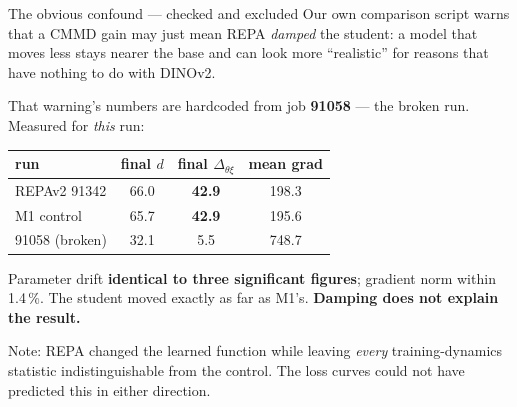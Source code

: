 \documentclass[10pt,aspectratio=169]{beamer}
\newcommand{\good}[1]{\textcolor{good}{\textbf{#1}}}
\begin{document}
\begin{frame}{The obvious confound --- checked and excluded}
  Our own comparison script warns that a CMMD gain may just mean REPA \emph{damped} the student:
  a model that moves less stays nearer the base and can look more ``realistic'' for reasons that
  have nothing to do with DINOv2.

  \vspace{0.5em}
  That warning's numbers are hardcoded from job \textbf{91058} --- the broken run. Measured for
  \emph{this} run:

  \begin{center}
  \begin{tabular}{lccc}
    \toprule
    run & final $d$ & final $\Delta_{\theta\xi}$ & mean grad \\
    \midrule
    REPAv2 91342 & 66.0 & \textbf{42.9} & 198.3 \\
    M1 control & 65.7 & \textbf{42.9} & 195.6 \\
    91058 (broken) & 32.1 & 5.5 & 748.7 \\
    \bottomrule
  \end{tabular}
  \end{center}

  \vspace{0.5em}
  Parameter drift \textbf{identical to three significant figures}; gradient norm within 1.4\,\%.
  The student moved exactly as far as M1's. \good{Damping does not explain the result.}

  \begin{block}{}
    \small Note: REPA changed the learned function while leaving \emph{every} training-dynamics
    statistic indistinguishable from the control. The loss curves could not have predicted this
    in either direction.
  \end{block}
\end{frame}
\end{document}
